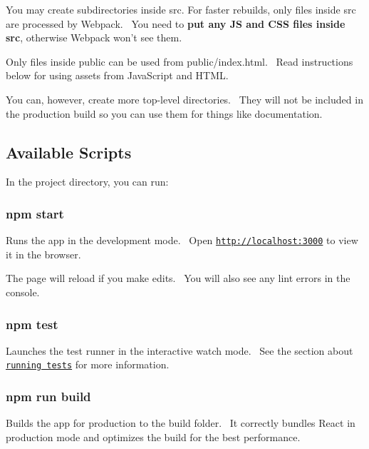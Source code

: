 You may create subdirectories inside {\ttfamily src}. For faster rebuilds, only files inside {\ttfamily src} are processed by Webpack.~\newline
 You need to {\bfseries put any JS and C\+SS files inside {\ttfamily src}}, otherwise Webpack won’t see them.

Only files inside {\ttfamily public} can be used from {\ttfamily public/index.\+html}.~\newline
 Read instructions below for using assets from Java\+Script and H\+T\+ML.

You can, however, create more top-\/level directories.~\newline
 They will not be included in the production build so you can use them for things like documentation.

\subsection*{Available Scripts}

In the project directory, you can run\+:

\subsubsection*{{\ttfamily npm start}}

Runs the app in the development mode.~\newline
 Open \href{http://localhost:3000}{\tt http\+://localhost\+:3000} to view it in the browser.

The page will reload if you make edits.~\newline
 You will also see any lint errors in the console.

\subsubsection*{{\ttfamily npm test}}

Launches the test runner in the interactive watch mode.~\newline
 See the section about \href{#running-tests}{\tt running tests} for more information.

\subsubsection*{{\ttfamily npm run build}}

Builds the app for production to the {\ttfamily build} folder.~\newline
 It correctly bundles React in production mode and optimizes the build for the best performance.

